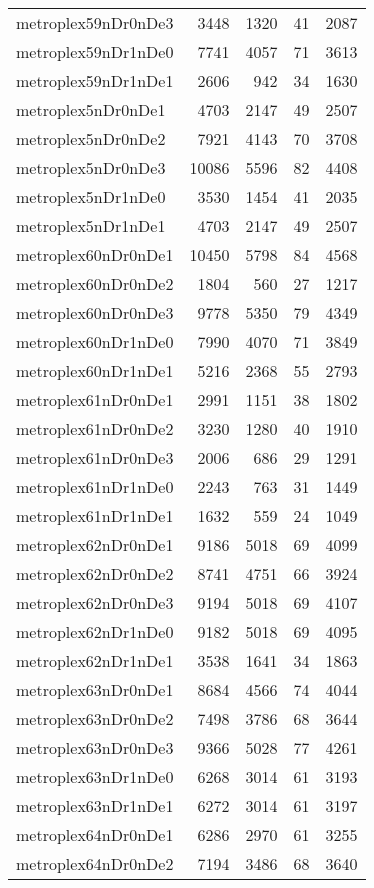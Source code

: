 \documentclass[../../../thesis.tex]{subfiles}
\begin{document}
\begin{longtable}{lrrrr}
metroplex59nDr0nDe3 & 3448 & 1320 & 41 & 2087 \\
metroplex59nDr1nDe0 & 7741 & 4057 & 71 & 3613 \\
metroplex59nDr1nDe1 & 2606 & 942 & 34 & 1630 \\
metroplex5nDr0nDe1 & 4703 & 2147 & 49 & 2507 \\
metroplex5nDr0nDe2 & 7921 & 4143 & 70 & 3708 \\
metroplex5nDr0nDe3 & 10086 & 5596 & 82 & 4408 \\
metroplex5nDr1nDe0 & 3530 & 1454 & 41 & 2035 \\
metroplex5nDr1nDe1 & 4703 & 2147 & 49 & 2507 \\
metroplex60nDr0nDe1 & 10450 & 5798 & 84 & 4568 \\
metroplex60nDr0nDe2 & 1804 & 560 & 27 & 1217 \\
metroplex60nDr0nDe3 & 9778 & 5350 & 79 & 4349 \\
metroplex60nDr1nDe0 & 7990 & 4070 & 71 & 3849 \\
metroplex60nDr1nDe1 & 5216 & 2368 & 55 & 2793 \\
metroplex61nDr0nDe1 & 2991 & 1151 & 38 & 1802 \\
metroplex61nDr0nDe2 & 3230 & 1280 & 40 & 1910 \\
metroplex61nDr0nDe3 & 2006 & 686 & 29 & 1291 \\
metroplex61nDr1nDe0 & 2243 & 763 & 31 & 1449 \\
metroplex61nDr1nDe1 & 1632 & 559 & 24 & 1049 \\
metroplex62nDr0nDe1 & 9186 & 5018 & 69 & 4099 \\
metroplex62nDr0nDe2 & 8741 & 4751 & 66 & 3924 \\
metroplex62nDr0nDe3 & 9194 & 5018 & 69 & 4107 \\
metroplex62nDr1nDe0 & 9182 & 5018 & 69 & 4095 \\
metroplex62nDr1nDe1 & 3538 & 1641 & 34 & 1863 \\
metroplex63nDr0nDe1 & 8684 & 4566 & 74 & 4044 \\
metroplex63nDr0nDe2 & 7498 & 3786 & 68 & 3644 \\
metroplex63nDr0nDe3 & 9366 & 5028 & 77 & 4261 \\
metroplex63nDr1nDe0 & 6268 & 3014 & 61 & 3193 \\
metroplex63nDr1nDe1 & 6272 & 3014 & 61 & 3197 \\
metroplex64nDr0nDe1 & 6286 & 2970 & 61 & 3255 \\
metroplex64nDr0nDe2 & 7194 & 3486 & 68 & 3640 \\

\end{longtable}
\end{document}
